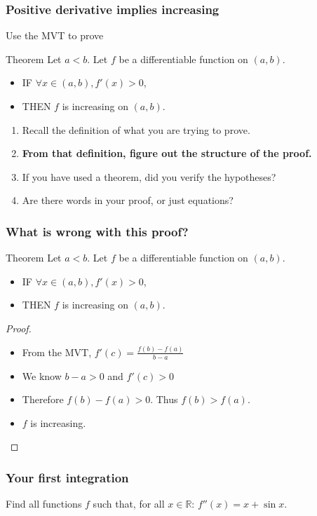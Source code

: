 \documentclass[14pt]{beamer}
\newcommand {\DS} [1] {${\displaystyle #1}$}
\newcommand {\R}{\mathbb{R}}
\begin{document}
\begin{frame}[t]
\frametitle{Positive derivative implies increasing}

Use the MVT to prove

\begin{block}{Theorem}
Let $a < b$.  Let $f$ be a differentiable function on $(a,b)$. 
\begin{itemize}
	\item  IF $\forall x \in (a,b), f'(x) >0$,
	\item  THEN $f$ is increasing on $(a,b)$.
\end{itemize}
\end{block}

\pause

\begin{enumerate}
	\item  Recall the definition of what you are trying to prove.
	\item  {\bf From that definition, figure out the structure of the proof.}
	\item  If you have used a theorem, did you verify the hypotheses?
	\item  Are there words in your proof, or just equations?
\end{enumerate}

\end{frame}

\begin{frame}[t]
\frametitle{What is wrong with this proof?}

\begin{block}{Theorem}
Let $a < b$.  Let $f$ be a differentiable function on $(a,b)$. 
\begin{itemize}
	\item  IF $\forall x \in (a,b), f'(x) >0$,
	\item  THEN $f$ is increasing on $(a,b)$.
\end{itemize}
\end{block}


\begin{proof}
\begin{itemize}
	\item  From the MVT,
		\DS{
			f'(c) = \frac{f(b) - f(a)}{b-a}
		}
	\item  We know \DS{b-a>0} and  \DS{f'(c)>0}
	\item  Therefore \DS{f(b) - f(a)>0}. \quad  Thus \DS{f(b) > f(a)}.
	\item $f$ is increasing.
\end{itemize}
\end{proof}

\end{frame}
\begin{frame}[t]
\frametitle{Your first integration}


  Find all functions $f$ such that, for all \DS{x \in \R}:
		\DS{f''(x) = x + \sin x}.
	
	
\end{frame}
\end{document}
